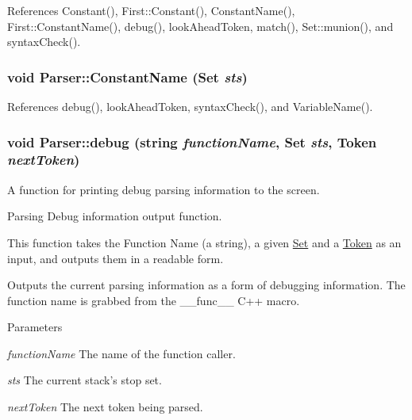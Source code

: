 References Constant(), First::Constant(), ConstantName(), First::ConstantName(), debug(), lookAheadToken, match(), Set::munion(), and syntaxCheck().

\hypertarget{classParser_aec8b7271b672c8d609cf1df8b51cacc9}{
\subsubsection[{ConstantName}]{\setlength{\rightskip}{0pt plus 5cm}void Parser::ConstantName ({\bf Set} {\em sts})}}
\label{classParser_aec8b7271b672c8d609cf1df8b51cacc9}


References debug(), lookAheadToken, syntaxCheck(), and VariableName().

\hypertarget{classParser_a862ea4d5a0d322471e3183aa4d51ad4b}{
\subsubsection[{debug}]{\setlength{\rightskip}{0pt plus 5cm}void Parser::debug (string {\em functionName}, \/  {\bf Set} {\em sts}, \/  {\bf Token} {\em nextToken})}}
\label{classParser_a862ea4d5a0d322471e3183aa4d51ad4b}


A function for printing debug parsing information to the screen. 

Parsing Debug information output function.

This function takes the Function Name (a string), a given \hyperlink{classSet}{Set} and a \hyperlink{classToken}{Token} as an input, and outputs them in a readable form.

Outputs the current parsing information as a form of debugging information. The function name is grabbed from the \_\-\_\-func\_\-\_\- C++ macro.


\begin{DoxyParams}{Parameters}
\item[{\em functionName}]The name of the function caller. \item[{\em sts}]The current stack's stop set. \item[{\em nextToken}]The next token being parsed. \end{DoxyParams}


